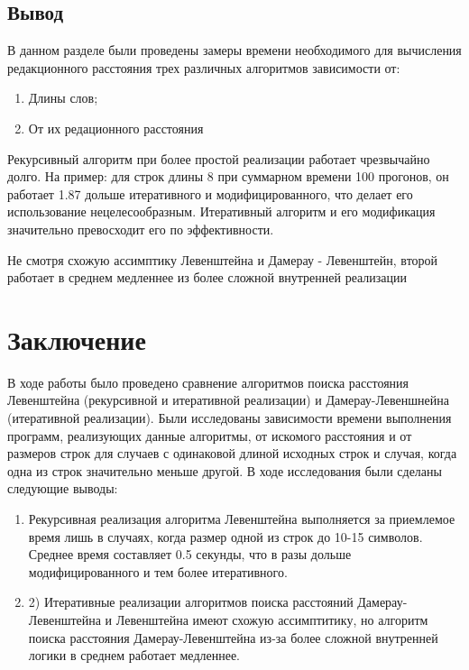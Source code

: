 \documentclass[a4paper, 14pt]{article}
\begin{document}
	
	\newpage
	\subsection{Вывод}
	
	В данном разделе были проведены замеры времени необходимого для вычисления редакционного расстояния трех различных алгоритмов зависимости от:
	
	\begin{enumerate}
		\item Длины слов;
		\item От их редационного расстояния
	\end{enumerate}
	
	Рекурсивный алгоритм при более простой реализации работает чрезвычайно долго. На пример: для строк длины 8 при суммарном времени 100 прогонов, он работает 1.87 дольше итеративного и модифицированного,  что делает его использование нецелесообразным. Итеративный алгоритм и его модификация значительно превосходит его по эффективности.
	
	Не смотря схожую ассимптику Левенштейна и Дамерау - Левенштейн, второй работает в среднем медленнее из более сложной внутренней реализации
		
	\newpage
	\section*{Заключение}
	
	В ходе работы было проведено сравнение алгоритмов поиска расстояния Левенштейна (рекурсивной и итеративной реализации) и Дамерау-Левеншнейна (итеративной реализации). Были исследованы зависимости времени выполнения программ, реализующих данные алгоритмы, от искомого расстояния и от размеров строк для случаев с одинаковой длиной исходных строк и случая, когда одна из строк значительно меньше другой. В ходе исследования были сделаны следующие выводы:
	
	\begin{enumerate}
		\item Рекурсивная реализация алгоритма Левенштейна выполняется за приемлемое время лишь в случаях, когда размер одной из строк до 10-15 символов. Среднее время составляет 0.5 секунды, что в разы дольше модифицированного и тем более итеративного.
		
		\item 2) Итеративные реализации алгоритмов поиска расстояний Дамерау-Левенштейна и Левенштейна имеют схожую ассимптитику, но алгоритм поиска расстояния Дамерау-Левенштейна из-за более сложной внутренней логики в среднем работает медленнее.
	\end{enumerate}
	
\end{document}
